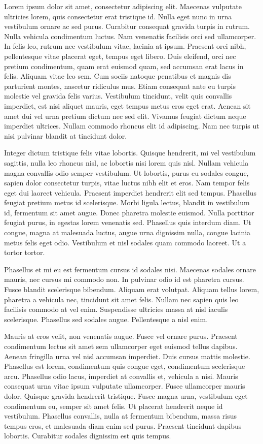\documentclass[letterpaper]{article}
\begin{document}
Lorem ipsum dolor sit amet, consectetur adipiscing elit. Maecenas vulputate ultricies lorem, quis consectetur erat tristique id. Nulla eget nunc in urna vestibulum ornare ac sed purus. Curabitur consequat gravida turpis in rutrum. Nulla vehicula condimentum luctus. Nam venenatis facilisis orci sed ullamcorper. In felis leo, rutrum nec vestibulum vitae, lacinia at ipsum. Praesent orci nibh, pellentesque vitae placerat eget, tempus eget libero. Duis eleifend, orci nec pretium condimentum, quam erat euismod quam, sed accumsan erat lacus in felis. Aliquam vitae leo sem. Cum sociis natoque penatibus et magnis dis parturient montes, nascetur ridiculus mus. Etiam consequat ante eu turpis molestie vel gravida felis varius. Vestibulum tincidunt, velit quis convallis imperdiet, est nisi aliquet mauris, eget tempus metus eros eget erat. Aenean sit amet dui vel urna pretium dictum nec sed elit. Vivamus feugiat dictum neque imperdiet ultrices. Nullam commodo rhoncus elit id adipiscing. Nam nec turpis ut nisi pulvinar blandit at tincidunt dolor.

Integer dictum tristique felis vitae lobortis. Quisque hendrerit, mi vel vestibulum sagittis, nulla leo rhoncus nisl, ac lobortis nisi lorem quis nisl. Nullam vehicula magna convallis odio semper vestibulum. Ut lobortis, purus eu sodales congue, sapien dolor consectetur turpis, vitae luctus nibh elit et eros. Nam tempor felis eget dui laoreet vehicula. Praesent imperdiet hendrerit elit sed tempus. Phasellus feugiat pretium metus id scelerisque. Morbi ligula lectus, blandit in vestibulum id, fermentum sit amet augue. Donec pharetra molestie euismod. Nulla porttitor feugiat purus, in egestas lorem venenatis sed. Phasellus quis interdum diam. Ut congue, magna at malesuada luctus, augue urna dignissim nulla, congue lacinia metus felis eget odio. Vestibulum et nisl sodales quam commodo laoreet. Ut a tortor tortor.

Phasellus et mi eu est fermentum cursus id sodales nisi. Maecenas sodales ornare mauris, nec cursus mi commodo non. In pulvinar odio id est pharetra cursus. Fusce blandit scelerisque bibendum. Aliquam erat volutpat. Aliquam tellus lorem, pharetra a vehicula nec, tincidunt sit amet felis. Nullam nec sapien quis leo facilisis commodo at vel enim. Suspendisse ultricies massa at nisl iaculis scelerisque. Phasellus sed sodales augue. Pellentesque a nisl enim.

Mauris at eros velit, non venenatis augue. Fusce vel ornare purus. Praesent condimentum lectus sit amet sem ullamcorper eget euismod tellus dapibus. Aenean fringilla urna vel nisl accumsan imperdiet. Duis cursus mattis molestie. Phasellus est lorem, condimentum quis congue eget, condimentum scelerisque arcu. Phasellus odio lacus, imperdiet at convallis et, vehicula a nisi. Mauris consequat urna vitae ipsum vulputate ullamcorper. Fusce ullamcorper mauris dolor. Quisque gravida hendrerit tristique. Fusce magna urna, vestibulum eget condimentum eu, semper sit amet felis. Ut placerat hendrerit neque id vestibulum. Phasellus convallis, nulla at fermentum bibendum, massa risus tempus eros, et malesuada diam enim sed purus. Praesent tincidunt dapibus lobortis. Curabitur sodales dignissim est quis tempus.
\end{document}
